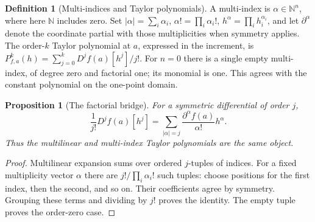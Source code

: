 \documentclass[11pt,oneside,openany]{book}
\newtheorem{proposition}[theorem]{Proposition}
\theoremstyle{definition}
\newtheorem{definition}[theorem]{Definition}
\theoremstyle{remark}
\newcommand{\N}{\mathbb N}
\newcommand{\abs}[1]{\lvert#1\rvert}
\begin{document}
\begin{definition}[Multi-indices and Taylor polynomials]\label{d04:03:multi-index}
A multi-index is $\alpha\in\N^n$, where here $\N$ includes zero.
Set $\abs{\alpha}=\sum_i\alpha_i$, $\alpha!=\prod_i\alpha_i!$,
$h^\alpha=\prod_ih_i^{\alpha_i}$, and let $\partial^\alpha$ denote
the coordinate partial with those multiplicities when symmetry applies.
The order-$k$ Taylor polynomial at $a$, expressed in the increment, is
$P_{f,a}^k(h)=\sum_{j=0}^kD^jf(a)[h^j]/j!$.
For $n=0$ there is a single empty multi-index, of degree zero and factorial
one; its monomial is one. This agrees with the constant polynomial on
the one-point domain.
\end{definition}

\begin{proposition}[The factorial bridge]\label{d04:03:factorial-bridge}
For a symmetric differential of order $j$,
\[
 \frac1{j!}D^jf(a)[h^j]
  =\sum_{\abs{\alpha}=j}\frac{\partial^\alpha f(a)}{\alpha!}h^\alpha.
\]
Thus the multilinear and multi-index Taylor polynomials are the same object.
\end{proposition}
\begin{proof}
Multilinear expansion sums over ordered $j$-tuples of indices. For a fixed
multiplicity vector $\alpha$ there are $j!/\prod_i\alpha_i!$ such
tuples: choose positions for the first index, then the second, and so on.
Their coefficients agree by symmetry. Grouping these terms and dividing by
$j!$ proves the identity. The empty tuple proves the order-zero case.
\end{proof}
\end{document}
